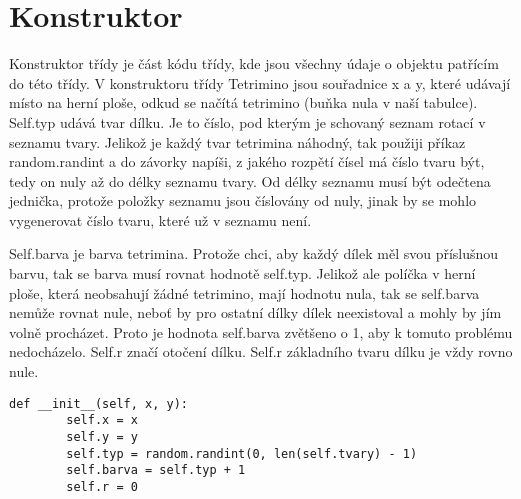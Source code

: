 \documentclass[12pt]{report}			%
\begin{document}
			\section{Konstruktor}
Konstruktor třídy je část kódu třídy, kde jsou všechny údaje o objektu patřícím do této třídy.
V konstruktoru třídy Tetrimino jsou souřadnice x a y, které udávají místo na herní ploše, odkud se načítá tetrimino (buňka nula v naší tabulce). Self.typ udává tvar dílku.  Je to číslo, pod kterým je schovaný seznam rotací v seznamu tvary. Jelikož je každý tvar tetrimina náhodný, tak použiji příkaz random.randint a do závorky napíši, z jakého rozpětí čísel má číslo tvaru být, tedy on nuly až do délky seznamu tvary. Od délky seznamu musí být odečtena jednička, protože položky seznamu jsou číslovány od nuly, jinak by se mohlo vygenerovat číslo tvaru, které už v seznamu není.

Self.barva je barva tetrimina. Protože chci, aby každý dílek měl svou příslušnou barvu, tak se barva musí rovnat hodnotě self.typ. Jelikož ale políčka v herní ploše, která neobsahují žádné tetrimino, mají hodnotu nula, tak se self.barva nemůže rovnat nule, neboť by pro ostatní dílky dílek neexistoval a mohly by jím volně procházet. Proto je hodnota self.barva zvětšeno o 1, aby k tomuto problému nedocházelo. Self.r značí otočení dílku. Self.r základního tvaru dílku je vždy rovno nule.
\begin{lstlisting}[title={Program tetris.py}, caption={Konstruktor třídy Tetrimino}, 							label={lst:tetris.py}]
    def __init__(self, x, y):
        self.x = x
        self.y = y
        self.typ = random.randint(0, len(self.tvary) - 1)
        self.barva = self.typ + 1
        self.r = 0
\end{lstlisting}  
\end{document}
